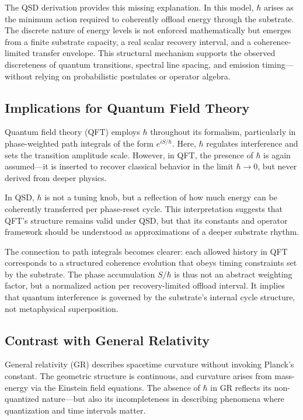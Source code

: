 \documentclass[ht-mathphys]{ht-fmt}
\theoremstyle{thmstyleone}%
\theoremstyle{thmstyletwo}%
\theoremstyle{thmstylethree}%
\begin{document}
The QSD derivation provides this missing explanation. In this model, $\hbar$ arises as the minimum action required to coherently offload energy through the substrate. The discrete nature of energy levels is not enforced mathematically but emerges from a finite substrate capacity, a real scalar recovery interval, and a coherence-limited transfer envelope. This structural mechanism supports the observed discreteness of quantum transitions, spectral line spacing, and emission timing—without relying on probabilistic postulates or operator algebra.

\subsection{Implications for Quantum Field Theory}

Quantum field theory (QFT) employs $\hbar$ throughout its formalism, particularly in phase-weighted path integrals of the form $e^{iS/\hbar}$. Here, $\hbar$ regulates interference and sets the transition amplitude scale. However, in QFT, the presence of $\hbar$ is again assumed—it is inserted to recover classical behavior in the limit $\hbar \to 0$, but never derived from deeper physics.

In QSD, $\hbar$ is not a tuning knob, but a reflection of how much energy can be coherently transferred per phase-reset cycle. This interpretation suggests that QFT’s structure remains valid under QSD, but that its constants and operator framework should be understood as approximations of a deeper substrate rhythm.

The connection to path integrals becomes clearer: each allowed history in QFT corresponds to a structured coherence evolution that obeys timing constraints set by the substrate. The phase accumulation $S/\hbar$ is thus not an abstract weighting factor, but a normalized action per recovery-limited offload interval. It implies that quantum interference is governed by the substrate’s internal cycle structure, not metaphysical superposition.

\subsection{Contrast with General Relativity}

General relativity (GR) describes spacetime curvature without invoking Planck’s constant. The geometric structure is continuous, and curvature arises from mass-energy via the Einstein field equations. The absence of $\hbar$ in GR reflects its non-quantized nature—but also its incompleteness in describing phenomena where quantization and time intervals matter.
\end{document}
